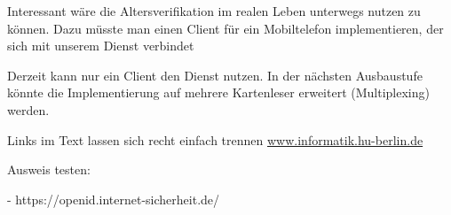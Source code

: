 \documentclass[toc=flat,fontsize=11pt,a4paper,titlepage,headsepline,numbers=noenddot, bibliography=totoc]{scrartcl}
\begin{document}
Interessant wäre die Altersverifikation im realen Leben unterwegs nutzen zu können.
Dazu müsste man einen Client für ein Mobiltelefon implementieren, der sich mit unserem Dienst verbindet
	
Derzeit kann nur ein Client den Dienst nutzen. In der nächsten Ausbaustufe könnte die Implementierung auf mehrere Kartenleser erweitert
 (Multiplexing) werden.
 
 Links im Text lassen sich recht einfach trennen
\url{www.informatik.hu-berlin.de}
\cite{TR3127}


\printbibliography

Ausweis testen:

- https://openid.internet-sicherheit.de/
\end{document}
